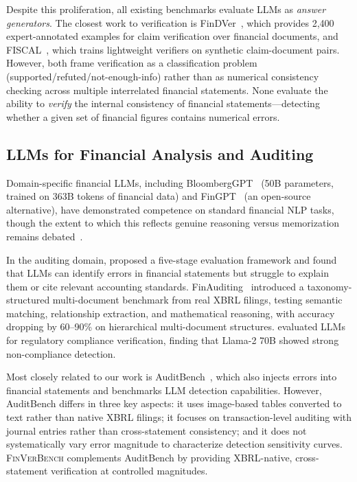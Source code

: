 \documentclass[11pt]{article}
\newcommand{\benchmark}{\textsc{FinVerBench}}
\begin{document}
Despite this proliferation, all existing benchmarks evaluate LLMs as \emph{answer generators}.
The closest work to verification is FinDVer~\citep{wei2024findver}, which provides 2,400 expert-annotated examples for claim verification over financial documents, and FISCAL~\citep{nair2025fiscal}, which trains lightweight verifiers on synthetic claim-document pairs.
However, both frame verification as a classification problem (supported/refuted/not-enough-info) rather than as numerical consistency checking across multiple interrelated financial statements.
None evaluate the ability to \emph{verify} the internal consistency of financial statements---detecting whether a given set of financial figures contains numerical errors.

\subsection{LLMs for Financial Analysis and Auditing}
\label{sec:related:analysis}

Domain-specific financial LLMs, including BloombergGPT~\citep{wu2023bloomberggpt} (50B parameters, trained on 363B tokens of financial data) and FinGPT~\citep{yang2023fingpt} (an open-source alternative), have demonstrated competence on standard financial NLP tasks, though the extent to which this reflects genuine reasoning versus memorization remains debated~\citep{memorization2025}.

In the auditing domain, \citet{auditllm2025} proposed a five-stage evaluation framework and found that LLMs can identify errors in financial statements but struggle to explain them or cite relevant accounting standards.
FinAuditing~\citep{wang2025finauditing} introduced a taxonomy-structured multi-document benchmark from real XBRL filings, testing semantic matching, relationship extraction, and mathematical reasoning, with accuracy dropping by 60--90\% on hierarchical multi-document structures.
\citet{compliance2025} evaluated LLMs for regulatory compliance verification, finding that Llama-2 70B showed strong non-compliance detection.

Most closely related to our work is AuditBench~\citep{wang2025auditbench}, which also injects errors into financial statements and benchmarks LLM detection capabilities.
However, AuditBench differs in three key aspects: it uses image-based tables converted to text rather than native XBRL filings; it focuses on transaction-level auditing with journal entries rather than cross-statement consistency; and it does not systematically vary error magnitude to characterize detection sensitivity curves.
\benchmark{} complements AuditBench by providing XBRL-native, cross-statement verification at controlled magnitudes.
\end{document}
